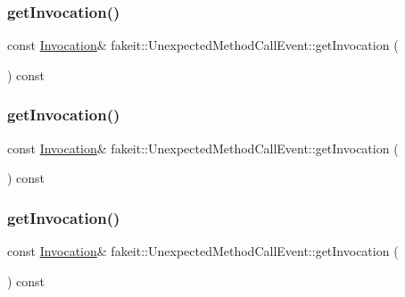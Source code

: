 \subsubsection{\texorpdfstring{getInvocation()}{getInvocation()}\hspace{0.1cm}{\footnotesize\ttfamily [1/9]}}
{\footnotesize\ttfamily const \mbox{\hyperlink{structfakeit_1_1Invocation}{Invocation}}\& fakeit\+::\+Unexpected\+Method\+Call\+Event\+::get\+Invocation (\begin{DoxyParamCaption}{ }\end{DoxyParamCaption}) const\hspace{0.3cm}{\ttfamily [inline]}}

\mbox{\label{structfakeit_1_1UnexpectedMethodCallEvent_a80a3e753a6163cecbb4d6f1b75a03f9f}} 
\subsubsection{\texorpdfstring{getInvocation()}{getInvocation()}\hspace{0.1cm}{\footnotesize\ttfamily [2/9]}}
{\footnotesize\ttfamily const \mbox{\hyperlink{structfakeit_1_1Invocation}{Invocation}}\& fakeit\+::\+Unexpected\+Method\+Call\+Event\+::get\+Invocation (\begin{DoxyParamCaption}{ }\end{DoxyParamCaption}) const\hspace{0.3cm}{\ttfamily [inline]}}

\mbox{\label{structfakeit_1_1UnexpectedMethodCallEvent_a80a3e753a6163cecbb4d6f1b75a03f9f}} 
\subsubsection{\texorpdfstring{getInvocation()}{getInvocation()}\hspace{0.1cm}{\footnotesize\ttfamily [3/9]}}
{\footnotesize\ttfamily const \mbox{\hyperlink{structfakeit_1_1Invocation}{Invocation}}\& fakeit\+::\+Unexpected\+Method\+Call\+Event\+::get\+Invocation (\begin{DoxyParamCaption}{ }\end{DoxyParamCaption}) const\hspace{0.3cm}{\ttfamily [inline]}}


